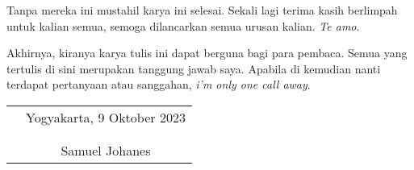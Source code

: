 \documentclass{skripsiactugm}
\begin{document}
  Tanpa mereka ini mustahil karya ini selesai. Sekali lagi terima kasih
  berlimpah untuk kalian semua, semoga dilancarkan semua urusan kalian. \textit{Te
  amo}.

  Akhirnya, kiranya karya tulis ini dapat berguna bagi para pembaca. Semua yang tertulis
  di sini merupakan tanggung jawab saya. Apabila di kemudian nanti terdapat
  pertanyaan atau sanggahan, \textit{i'm only one call away}.
  \vspace{0.8cm}

  \begin{tabular}{p{7cm}c}
     & Yogyakarta, 9 Oktober 2023 \\
     &                            \\
     &                            \\
     & Samuel Johanes
  \end{tabular}

  \newpage
  \makeatletter
  \renewcommand{\l@chapter}[2]{\ifnum \c@tocdepth >\z@\addpenalty\@secpenalty\addvspace{0em}
  \setlength{\@tempdima}{1.4em}
  \begingroup\parindent \z@ \rightskip \@pnumwidth\parfillskip -\@pnumwidth\leavevmode
  \bfseries\advance\leftskip\@tempdima\hskip -\leftskip#1\nobreak\ \leaders\hbox{$\m@th\mkern \@dotsep mu\hbox{.}\mkern \@dotsep mu$}\hfil\nobreak\hb@xt@\@pnumwidth{\hss #2}\par\endgroup\fi}
  \makeatother
  \begin{singlespacing}
    \tableofcontents
  \end{singlespacing}

  \newpage
  \begin{singlespacing}
    \listoftables
  \end{singlespacing}
\end{document}
